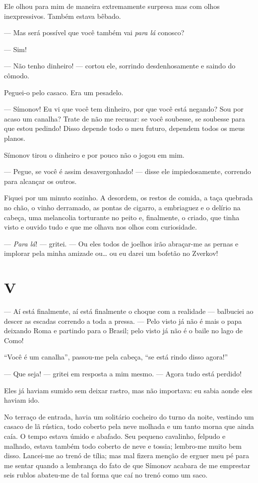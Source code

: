 Ele olhou para mim de maneira extremamente surpresa mas com olhos
inexpressivos. Também estava bêbado.

--- Mas será possível que você também vai \textit{para lá} conosco?

--- Sim!

--- Não tenho dinheiro! --- cortou ele, sorrindo desdenhosamente e saindo do
cômodo.

Peguei-o pelo casaco. Era um pesadelo.

--- Símonov! Eu vi que você tem dinheiro, por que você está negando? Sou
por acaso um canalha? Trate de não me recusar: se você soubesse, se
soubesse para que estou pedindo! Disso depende todo o meu futuro,
dependem todos os meus planos.

Símonov tirou o dinheiro e por pouco não o jogou em mim.

--- Pegue, se você é assim desavergonhado! --- disse ele impiedosamente,
correndo para alcançar os outros.

Fiquei por um minuto sozinho. A desordem, os restos de comida, a taça
quebrada no chão, o vinho derramado, as pontas de cigarro, a embriaguez
e o delírio na cabeça, uma melancolia torturante no peito e,
finalmente, o criado, que tinha visto e ouvido tudo e que me olhava nos
olhos com curiosidade.

--- \textit{Para lá}! --- gritei. --- Ou eles todos de
joelhos irão abraçar-me as pernas e implorar pela minha amizade ou\ldots{}
ou eu darei um bofetão no Zverkov!


\section{V}

--- Aí está finalmente, aí está finalmente o choque com a realidade ---
balbuciei ao descer as escadas correndo a toda a pressa. --- Pelo visto já
não é mais o papa deixando Roma e partindo para o Brasil; pelo visto já
não é o baile no lago de Como!

“Você é um canalha”, passou-me pela cabeça, “se está rindo disso agora!”

--- Que seja! --- gritei em resposta a mim mesmo. --- Agora tudo está perdido!

Eles já haviam sumido sem deixar rastro, mas não importava: eu sabia
aonde eles haviam ido.

No terraço de entrada, havia um solitário cocheiro do turno da noite,
vestindo um casaco de lã rústica, todo coberto pela neve molhada e um
tanto morna que ainda caía. O tempo estava úmido e abafado. Seu pequeno
cavalinho, felpudo e malhado, estava também todo coberto de neve e
tossia; lembro-me muito bem disso. Lancei-me ao trenó de tília; mas mal
fizera menção de erguer meu pé para me sentar quando a lembrança do
fato de que Símonov acabara de me emprestar seis rublos abateu-me de
tal forma que caí no trenó como um saco.

